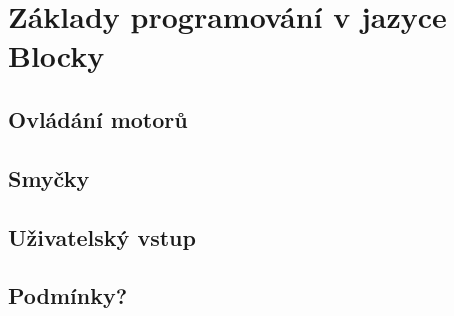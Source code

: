 \documentclass[../main.tex]{subfiles}
\begin{document}
	\section{Základy programování v jazyce Blocky}

	\subsection{Ovládání motorů}

	\subsection{Smyčky}

	\subsection{Uživatelský vstup}

	\subsection{Podmínky?}
\end{document}
